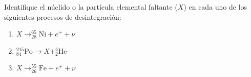 \item Identifique el núclido o la partícula elemental faltante ($X$) en cada uno de los siguientes procesos de desintegración:
\begin{enumerate}
    \item $X \to ^{65}_{28}\text{Ni} + e^+ + \nu$
    \item $^{215}_{84}\text{Po} \to X + ^{4}_{2}\text{He}$
    \item $X \to ^{55}_{26}\text{Fe} + e^+ + \nu$
\end{enumerate}